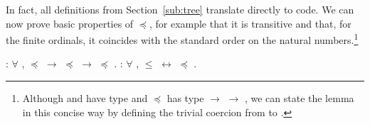 In fact, all definitions from Section~\ref{sub:tree} translate directly to
\Coq code. We can now prove basic properties of $\preceq$, for example
that it is transitive and that, for the finite ordinals, it coincides
with the standard order on the natural numbers.\footnote{Although
   and  have type
  and $\preceq$ has type 
  $\rightarrow$ 
  $\rightarrow$ , we can state the lemma in this
  concise way by defining the trivial coercion from
  to .}
\begin{singlespace}
\begin{coqdoccode}
\coqdocnoindent
{}
:
\ensuremath{\forall} \coqdocvar{\ensuremath{\alpha}}
\coqdocvar{\ensuremath{\beta}}
\coqdocvar{\ensuremath{\gamma}}, \coqdocvariable{\ensuremath{\alpha}}
\ensuremath{\preceq} \coqdocvariable{\ensuremath{\beta}}
\ensuremath{\rightarrow}
\coqdocvariable{\ensuremath{\beta}} \ensuremath{\preceq}
\coqdocvariable{\ensuremath{\gamma}}
\ensuremath{\rightarrow} \coqdocvariable{\ensuremath{\alpha}}
\ensuremath{\preceq}
\coqdocvariable{\ensuremath{\gamma}}.\coqdoceol
\coqdocemptyline
\coqdocnoindent
{}
 :
\ensuremath{\forall}  , 
\ensuremath{\le}  \ensuremath{\leftrightarrow}
 \ensuremath{\preceq} .\coqdoceol
\end{coqdoccode}
\end{singlespace}

